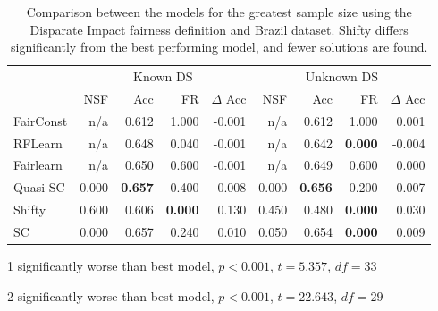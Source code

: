 \begin{table}[H]
\begin{threeparttable}
\centering
\begin{tabular}{lrrrrrrrr}
\toprule
 & \multicolumn{4}{c}{Known DS} & \multicolumn{4}{c}{Unknown DS} \\
 & NSF & Acc & FR & $\Delta$ Acc & NSF & Acc & FR & $\Delta$ Acc \\
\cmidrule(r){2-5} \cmidrule{6-9}
FairConst & n/a & 0.612 & 1.000 & -0.001 & n/a & 0.612 & 1.000 & 0.001 \\
RFLearn & n/a & 0.648 & 0.040 & -0.001 & n/a & 0.642 & \bfseries 0.000 & -0.004 \\
Fairlearn & n/a & 0.650 & 0.600 & -0.001 & n/a & 0.649 & 0.600 & 0.000 \\
Quasi-SC & 0.000 & \bfseries 0.657 & 0.400 & 0.008 & 0.000 & \bfseries 0.656 & 0.200 & 0.007 \\
Shifty & 0.600 & 0.606\tnote{1} & \bfseries 0.000 & 0.130 & 0.450 & 0.480\tnote{2} & \bfseries 0.000 & 0.030 \\
SC & 0.000 & 0.657 & 0.240 & 0.010 & 0.050 & 0.654 & \bfseries 0.000 & 0.009 \\
\bottomrule
\end{tabular}
\begin{tablenotes}
\item[1] significantly worse than best model, $p<0.001$, $t=5.357$, $df=33$
\item[2] significantly worse than best model, $p<0.001$, $t=22.643$, $df=29$
\end{tablenotes}
\end{threeparttable}
\caption{Comparison between the models for the greatest sample size using the Disparate Impact fairness definition and Brazil dataset. Shifty differs significantly from the best performing model, and fewer solutions are found.}
\label{dibrazil}
\end{table}


\clearpage

